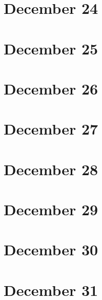 \section{December 24}

\section{December 25}

\section{December 26}

\section{December 27}

\section{December 28}

\section{December 29}

\section{December 30}

\section{December 31}

